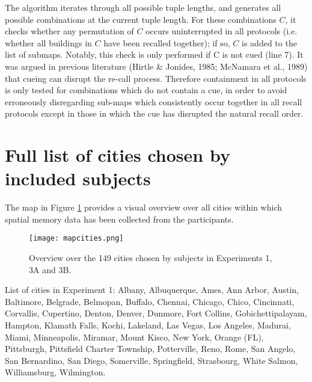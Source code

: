 The algorithm iterates through all possible tuple lengths, and generates all possible combinations at the current tuple length. For these combinations $C$, it checks whether any permutation of $C$ occurs uninterrupted in all protocols (i.e. whether all buildings in $C$ have been recalled together); if so, $C$ is added to the list of submaps. Notably, this check is only performed if C is not cued (line 7). It was argued in previous literature (Hirtle \& Jonides, 1985; McNamara et al., 1989) that cueing can disrupt the re-call process. Therefore containment in all protocols is only tested for combinations which do not contain a cue, in order to avoid erroneously disregarding sub-maps which consistently occur together in all recall protocols except in those in which the cue has disrupted the natural recall order.

\section{Full list of cities chosen by included subjects}

The map in Figure \ref{fig_map} provides a visual overview over all cities within which spatial memory data has been collected from the participants.

\begin{figure}[h]
	\centering
	\texttt{[image: mapcities.png]}
	\caption{Overview over the 149 cities chosen by subjects in Experiments 1, 3A and 3B.}
	\label{fig_map}
\end{figure}

List of cities in Experiment 1: \footnotesize{Albany, Albuquerque, Ames, Ann Arbor, Austin, Baltimore, Belgrade, Belmopan, Buffalo, Chennai, Chicago, Chico, Cincinnati, Corvallis, Cupertino, Denton, Denver, Dunmore, Fort Collins, Gobichettipalayam, Hampton, Klamath Falls, Kochi, Lakeland, Las Vegas, Los Angeles, Madurai, Miami, Minneapolis, Miramar, Mount Kisco, New York, Orange (FL), Pittsburgh, Pittsfield Charter Township, Potterville, Reno, Rome, San Angelo, San Bernardino, San Diego, Somerville, Springfield, Strasbourg, White Salmon, Williamsburg, Wilmington}.

\normalsize

